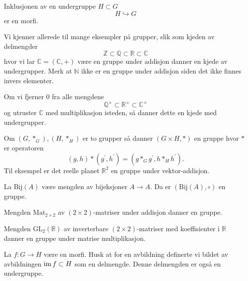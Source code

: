 \begin{remark}
    Inklusjonen av en undergruppe $H\subset G$
    \[
        H\hookrightarrow G
    \]
    er en morfi.
\end{remark}

\begin{example}
    Vi kjenner allerede til mange eksempler på grupper,
    slik som kjeden av delmengder
    \[
        \mathbb Z
        \subset \mathbb Q
        \subset \mathbb R
        \subset \mathbb C
    \]
    hvor vi lar $\mathbb C = (\mathbb C, +)$ være en gruppe under addisjon
    danner en kjede av undergrupper.
    Merk at $\mathbb N$ ikke er en gruppe under addisjon siden det ikke finnes
    invers elementer.

    Om vi fjerner $0$ fra alle mengdene
    \[
        \mathbb Q^\times
        \subset \mathbb R^\times
        \subset \mathbb C^\times
    \]
    og utruster $\mathbb C$ med multiplikasjon isteden,
    så danner dette en kjede med undergrupper.
\end{example}

\begin{example}
    Om $(G, \ast_G), (H, \ast_H)$ er to grupper så danner $(G\times H, \ast)$
    en gruppe hvor $\ast$ er operatoren
    \[
        (g, h)\ast (g^\prime, h^\prime)
        = (g \ast_G g^\prime, h\ast_H h^\prime).
    \]
    Til eksempel er det reelle planet $\mathbb R^2$ en gruppe under vektor-addisjon.
\end{example}

\begin{example}
    La $\mathrm{Bij}(A)$ være mengden av bijeksjoner $A\to A$.
    Da er $(\mathrm{Bij}(A), \circ)$ en gruppe.
\end{example}

\begin{example}
    Mengden $\mathrm{Mat}_{2\times 2}$ av $(2\times 2)$-matriser under addisjon
    danner en gruppe.
\end{example}

\begin{example}
    Mengden $\mathrm{GL}_2(\mathbb R)$ av inverterbare $(2\times2)$-matriser
    med koeffisienter i $\mathbb R$
    danner en gruppe under matrise multiplikasjon.
\end{example}

\begin{example}
    La $f\colon G\to H$ være en morfi.
    Husk at for en avbildning definerte vi bildet av avbildningen
    $\operatorname{im} f\subset H$ som en delmengde.
    Denne delmengden er også en undergruppe.
\end{example}

